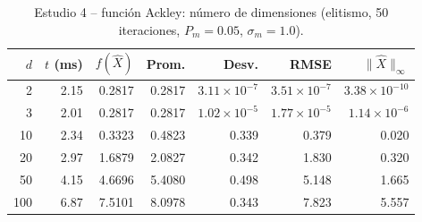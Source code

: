 \begin{table}[!t]
\centering
\scriptsize
\setlength{\tabcolsep}{3pt}
\caption{Estudio 4 -- funci\'on Ackley: n\'umero de dimensiones (elitismo, 50 iteraciones, $P_m=0.05$, $\sigma_m=1.0$).}
\label{tab:t4a}
\begin{tabular}{rrrrrrr}
\hline
$d$ & $t$ (ms) & $f(\hat{X})$ & Prom. & Desv. & RMSE & $\|\hat{X}\|_\infty$ \\
\hline
2 & 2.15 & 0.2817 & 0.2817 & $3.11{\times}10^{-7}$ & $3.51{\times}10^{-7}$ & $3.38{\times}10^{-10}$ \\
3 & 2.01 & 0.2817 & 0.2817 & $1.02{\times}10^{-5}$ & $1.77{\times}10^{-5}$ & $1.14{\times}10^{-6}$ \\
10 & 2.34 & 0.3323 & 0.4823 & 0.339 & 0.379 & 0.020 \\
20 & 2.97 & 1.6879 & 2.0827 & 0.342 & 1.830 & 0.320 \\
50 & 4.15 & 4.6696 & 5.4080 & 0.498 & 5.148 & 1.665 \\
100 & 6.87 & 7.5101 & 8.0978 & 0.343 & 7.823 & 5.557 \\
\hline
\end{tabular}
\end{table}
